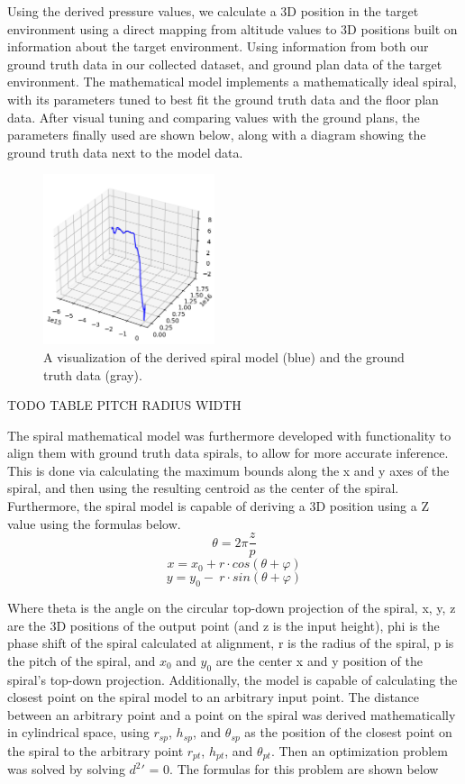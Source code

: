 Using the derived pressure values, we calculate a 3D position in the target environment using a direct mapping from altitude values to 3D positions built on information about the target environment. Using information from both our ground truth data in our collected dataset, and ground plan data of the target environment. The mathematical model implements a mathematically ideal spiral, with its parameters tuned to best fit the ground truth data and the floor plan data. After visual tuning and comparing values with the ground plans, the parameters finally used are shown below, along with a diagram showing the ground truth data next to the model data.

\begin{figure}[h] 
	\centering \includegraphics[height=5cm]{./images/ndi.png}
	\caption{A visualization of the derived spiral model (blue) and the ground truth data (gray).}
\end{figure}

TODO TABLE PITCH RADIUS WIDTH
\par

The spiral mathematical model was furthermore developed with functionality to align them with ground truth data spirals, to allow for more accurate inference. This is done via calculating the maximum bounds along the x and y axes of the spiral, and then using the resulting centroid as the center of the spiral. Furthermore, the spiral model is capable of deriving a 3D position using a Z value using the formulas below.
$$\theta=2\pi\frac{z}{p}$$
$$x=x_0+r\cdot cos\left(\theta+\varphi\right)$$
$$y=y_0-\ r\cdot sin\left(\theta+\varphi\right)$$ 

Where theta is the angle on the circular top-down projection of the spiral, x, y, z are the 3D positions of the output point (and z is the input height), phi is the phase shift of the spiral calculated at alignment, r is the radius of the spiral, p is the pitch of the spiral, and $x_0$ and $y_0$ are the center x and y position of the spiral's top-down projection.
Additionally, the model is capable of calculating the closest point on the spiral model to an arbitrary input point. The distance between an arbitrary point and a point on the spiral was derived mathematically in cylindrical space, using $r_{sp}$, $h_{sp}$, and $\theta_{sp}$ as the position of the closest point on the spiral to the arbitrary point $r_{pt}$, $h_{pt}$, and $\theta_{pt}$. Then an optimization problem was solved by solving $d^2\prime$ = 0. The formulas for this problem are shown below

